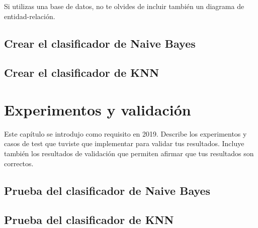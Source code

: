 \documentclass[a4paper, 12pt]{book}
\begin{document}
Si utilizas una base de datos, no te olvides de incluir también un diagrama de entidad-relación.

\section{Crear el clasificador de Naive Bayes} 
\label{sec:naivebayes}

\section{Crear el clasificador de KNN} 
\label{sec:knn}

\cleardoublepage
\chapter{Experimentos y validación}

Este capítulo se introdujo como requisito en 2019. 
Describe los experimentos y casos de test que tuviste que implementar para validar tus resultados. 
Incluye también los resultados de validación que permiten afirmar que tus resultados son correctos. 

\section{Prueba del clasificador de Naive Bayes} 
\label{sec:pruebabayes}

\section{Prueba del clasificador de KNN} 
\label{sec:pruebaknn}



\end{document}
